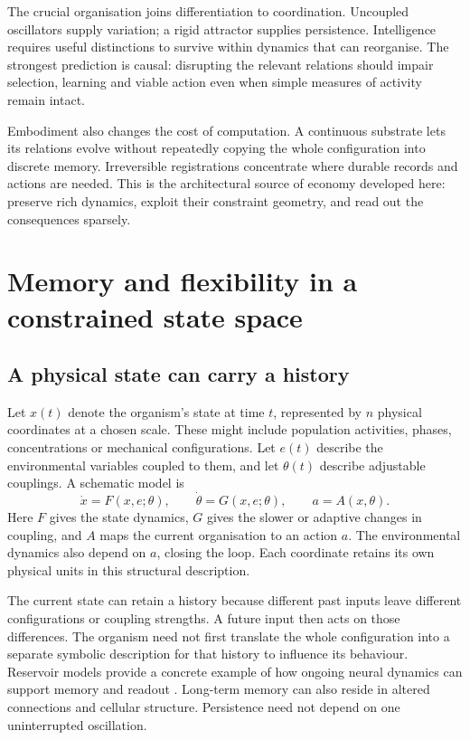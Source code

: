 \documentclass[11pt,a4paper]{article}
\begin{document}
The crucial organisation joins differentiation to coordination. Uncoupled oscillators supply variation; a rigid attractor supplies persistence. Intelligence requires useful distinctions to survive within dynamics that can reorganise. The strongest prediction is causal: disrupting the relevant relations should impair selection, learning and viable action even when simple measures of activity remain intact.

Embodiment also changes the cost of computation. A continuous substrate lets its relations evolve without repeatedly copying the whole configuration into discrete memory. Irreversible registrations concentrate where durable records and actions are needed. This is the architectural source of economy developed here: preserve rich dynamics, exploit their constraint geometry, and read out the consequences sparsely.

\section{Memory and flexibility in a constrained state space}
\label{sec:geometry}

\subsection{A physical state can carry a history}

Let \(x(t)\) denote the organism's state at time \(t\), represented by \(n\) physical coordinates at a chosen scale. These might include population activities, phases, concentrations or mechanical configurations. Let \(e(t)\) describe the environmental variables coupled to them, and let \(\theta(t)\) describe adjustable couplings. A schematic model is
\begin{equation}
 \dot{x}=F(x,e;\theta),\qquad
 \dot{\theta}=G(x,e;\theta),\qquad
 a=A(x,\theta).
 \label{eq:dynamics}
\end{equation}
Here \(F\) gives the state dynamics, \(G\) gives the slower or adaptive changes in coupling, and \(A\) maps the current organisation to an action \(a\). The environmental dynamics also depend on \(a\), closing the loop. Each coordinate retains its own physical units in this structural description.

The current state can retain a history because different past inputs leave different configurations or coupling strengths. A future input then acts on those differences. The organism need not first translate the whole configuration into a separate symbolic description for that history to influence its behaviour. Reservoir models provide a concrete example of how ongoing neural dynamics can support memory and readout \citep{enel2016reservoir}. Long-term memory can also reside in altered connections and cellular structure. Persistence need not depend on one uninterrupted oscillation.
\end{document}
